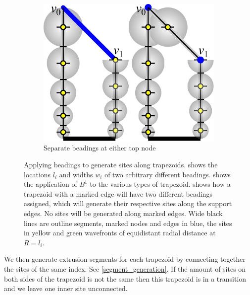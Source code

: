 \begin{figure}
\begin{subfigure}{0.5\columnwidth}
\end{subfigure}
\begin{subfigure}{0.34\columnwidth}\centering
\includegraphics[height=\figheight]{sources-method-trapezoid-beading-separate.pdf}
\caption{Separate beadings at either top node}\label{trapezoid_beading_separate}
\end{subfigure}
\caption{
Applying beadings to generate sites along trapezoids.
 shows the locations $l_i$ and widths $w_i$ of two arbitrary different beadings.
 shows the application of $B^1$ to the various types of trapezoid.
 shows how a trapezoid with a marked edge will have two different beadings assigned, which will generate their respective sites along the support edges.
No sites will be generated along marked edges.
Wide black lines are outline segments, marked nodes and edges in blue, the sites in yellow and green wavefronts of equidistant radial distance at $R = l_i$.
}
\label{site_placement}
\end{figure}


We then generate extrusion segments for each trapezoid by connecting together the sites of the same index.
See \cref{segment_generation}.
If the amount of sites on both sides of the trapezoid is not the same then this trapezoid is in a transition and we leave one inner site unconnected.


